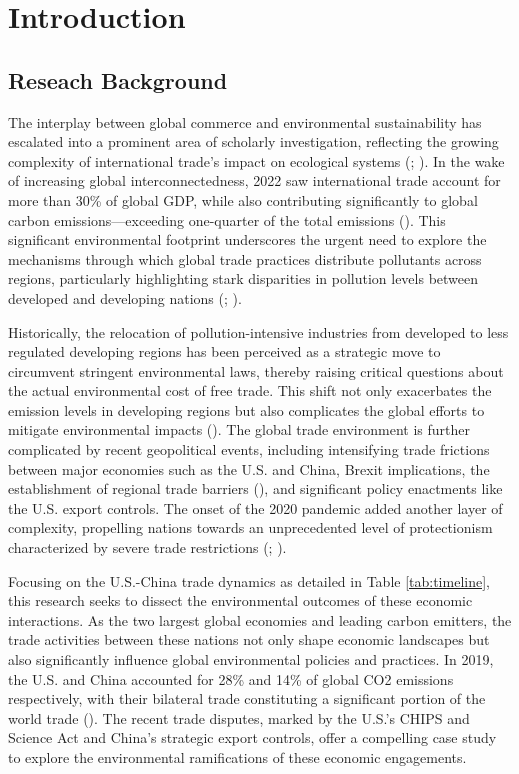 \chapter{Introduction}
\label{chap:INTRODUCTION}
\section{Reseach Background}
The interplay between global commerce and environmental sustainability has escalated into a prominent area of scholarly investigation, reflecting the growing complexity of international trade's impact on ecological systems (; ). In the wake of increasing global interconnectedness, 2022 saw international trade account for more than 30\% of global GDP, while also contributing significantly to global carbon emissions—exceeding one-quarter of the total emissions (). This significant environmental footprint underscores the urgent need to explore the mechanisms through which global trade practices distribute pollutants across regions, particularly highlighting stark disparities in pollution levels between developed and developing nations (; ).

Historically, the relocation of pollution-intensive industries from developed to less regulated developing regions has been perceived as a strategic move to circumvent stringent environmental laws, thereby raising critical questions about the actual environmental cost of free trade. This shift not only exacerbates the emission levels in developing regions but also complicates the global efforts to mitigate environmental impacts (). The global trade environment is further complicated by recent geopolitical events, including intensifying trade frictions between major economies such as the U.S. and China, Brexit implications, the establishment of regional trade barriers (), and significant policy enactments like the U.S. export controls. The onset of the 2020 pandemic added another layer of complexity, propelling nations towards an unprecedented level of protectionism characterized by severe trade restrictions (; ).

Focusing on the U.S.-China trade dynamics as detailed in Table \ref{tab:timeline}, this research seeks to dissect the environmental outcomes of these economic interactions. As the two largest global economies and leading carbon emitters, the trade activities between these nations not only shape economic landscapes but also significantly influence global environmental policies and practices. In 2019, the U.S. and China accounted for 28\% and 14\% of global CO2 emissions respectively, with their bilateral trade constituting a significant portion of the world trade (). The recent trade disputes, marked by the U.S.'s CHIPS and Science Act and China's strategic export controls, offer a compelling case study to explore the environmental ramifications of these economic engagements.

